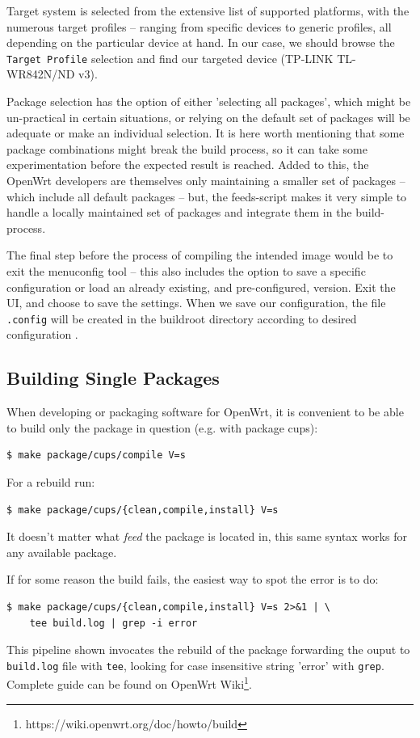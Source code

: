 Target system is selected from the extensive list of supported platforms, with the numerous target profiles – ranging from specific devices to generic profiles, all depending on the particular device at hand.
In our case, we should browse the {\tt Target Profile} selection and find our targeted device (TP-LINK TL-WR842N/ND v3).

Package selection has the option of either 'selecting all packages', which might be un-practical in certain situations, or relying on the default set of packages will be adequate or make an individual selection.
It is here worth mentioning that some package combinations might break the build process, so it can take some experimentation before the expected result is reached.
Added to this, the OpenWrt developers are themselves only maintaining a smaller set of packages – which include all default packages – but, the feeds-script makes it very simple to handle a locally maintained set of packages and integrate them in the build-process.

The final step before the process of compiling the intended image would be to exit the menuconfig tool – this also includes the option to save a specific configuration or load an already existing, and pre-configured, version.
Exit the UI, and choose to save the settings.
When we save our configuration, the file {\tt .config} will be created in the buildroot directory according to desired configuration \cite{build_owrt}.



\subsection{Building Single Packages}

When developing or packaging software for OpenWrt, it is convenient to be able to build only the package in question (e.g. with package cups):
\begin{lstlisting}[columns=fixed,basicstyle=\ttfamily\footnotesize,tabsize=4,backgroundcolor=\color{yellow!10}]
$ make package/cups/compile V=s
\end{lstlisting}
For a rebuild run:
\begin{lstlisting}[columns=fixed,basicstyle=\ttfamily\footnotesize,tabsize=4,backgroundcolor=\color{yellow!10}]
$ make package/cups/{clean,compile,install} V=s
\end{lstlisting}
It doesn't matter what {\it feed} the package is located in, this same syntax works for any available package.

If for some reason the build fails, the easiest way to spot the error is to do:
\begin{lstlisting}[columns=fixed,basicstyle=\ttfamily\footnotesize,tabsize=4,backgroundcolor=\color{yellow!10}]
$ make package/cups/{clean,compile,install} V=s 2>&1 | \
    tee build.log | grep -i error
\end{lstlisting}
This pipeline shown invocates the rebuild of the package forwarding the ouput to {\tt build.log} file with {\tt tee}, looking for case insensitive string 'error' with {\tt grep}.
Complete guide can be found on OpenWrt Wiki\footnote{https://wiki.openwrt.org/doc/howto/build}.

